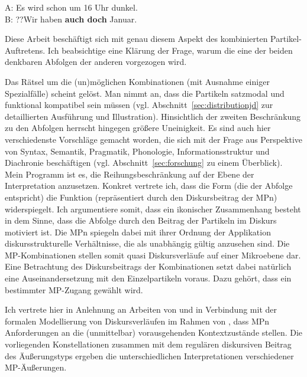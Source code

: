\begin{exe}
	\ex\label{13} 
		A: Es wird schon um 16 Uhr dunkel. \\
		B: ??Wir haben \textbf{auch doch }Januar.
\end{exe}
Diese Arbeit beschäftigt sich mit genau diesem Aspekt des kombinierten Partikel-Auftretens. Ich beabsichtige eine Klärung der Frage, warum die eine der beiden denkbaren Abfolgen der anderen vorgezogen wird. 

Das Rätsel um die (un)möglichen Kombinationen (mit Ausnahme einiger Spezi\-alfälle) scheint gelöst. Man nimmt an, dass die Partikeln satzmodal und funktional kompatibel sein müssen (vgl. Abschnitt~\ref{sec:distributionjd} zur detaillierten Ausführung und Illustration). Hinsichtlich der zweiten Beschränkung zu den Abfolgen herrscht hingegen größere Uneinigkeit. Es sind auch hier verschiedenste Vorschläge gemacht worden, die sich mit der Frage aus Perspektive von Syntax, Semantik, Pragmatik, Phonologie, Informationsstruktur und Diachro\-nie beschäftigen (vgl. Abschnitt~\ref{sec:forschung} zu einem Überblick). \\

\noindent
Mein Programm ist es, die Reihungsbeschränkung auf der Ebene der Interpretation anzusetzen. Konkret vertrete ich, dass die Form (die der Abfolge entspricht) die Funktion (repräsentiert durch den Diskursbeitrag der MPn) widerspiegelt. Ich argumentiere somit, dass ein ikonischer Zusammenhang besteht in dem Sinne, dass die Abfolge durch den Beitrag der Partikeln im Diskurs motiviert ist. Die MPn spiegeln dabei mit ihrer Ordnung der Applikation diskursstrukturelle Verhältnisse, die als unabhängig gültig anzusehen sind. Die MP-Kombinationen stellen somit quasi Diskursverläufe auf einer \glq Mikroebene\grq {} dar. \\

\noindent
Eine Betrachtung des Diskursbeitrags der Kombinationen setzt dabei natürlich eine Auseinandersetzung mit den Einzelpartikeln voraus. Dazu gehört, dass ein bestimmter MP-Zugang gewählt wird. 

Ich vertrete hier in Anlehnung an Arbeiten von \cite{Diewald1999a, Diewald2006, Diewald2007} und \cite{Diewald1998} in Verbindung mit der formalen Modellierung von Diskursverläufen im Rahmen von \cite{Farkas2010}, dass MPn Anforderungen an die (unmittelbar) vorausgehenden Kontextzustände stellen. Die vorliegenden Konstellationen zusammen mit dem regulären diskursiven Beitrag des Äuße\-rungstyps ergeben die unterschiedlichen Interpretationen verschiedener MP-Äu\-ßerungen.

